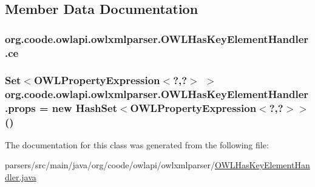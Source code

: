 \subsection{Member Data Documentation}
\hypertarget{classorg_1_1coode_1_1owlapi_1_1owlxmlparser_1_1_o_w_l_has_key_element_handler_a6058df6fb8f330e94ec80dbce0ddbad7}{
\subsubsection[{ce}]{ org.\-coode.\-owlapi.\-owlxmlparser.\-O\-W\-L\-Has\-Key\-Element\-Handler.\-ce\hspace{0.3cm}{\ttfamily [private]}}}\label{classorg_1_1coode_1_1owlapi_1_1owlxmlparser_1_1_o_w_l_has_key_element_handler_a6058df6fb8f330e94ec80dbce0ddbad7}
\hypertarget{classorg_1_1coode_1_1owlapi_1_1owlxmlparser_1_1_o_w_l_has_key_element_handler_af0151fe3603afd7f71d193151a4929a1}{
\subsubsection[{props}]{\setlength{\rightskip}{0pt plus 5cm}Set$<$O\-W\-L\-Property\-Expression$<$?,?$>$ $>$ org.\-coode.\-owlapi.\-owlxmlparser.\-O\-W\-L\-Has\-Key\-Element\-Handler.\-props = new Hash\-Set$<$O\-W\-L\-Property\-Expression$<$?,?$>$$>$()\hspace{0.3cm}{\ttfamily [private]}}}\label{classorg_1_1coode_1_1owlapi_1_1owlxmlparser_1_1_o_w_l_has_key_element_handler_af0151fe3603afd7f71d193151a4929a1}


The documentation for this class was generated from the following file\-:\begin{DoxyCompactItemize}
\item 
parsers/src/main/java/org/coode/owlapi/owlxmlparser/\hyperlink{_o_w_l_has_key_element_handler_8java}{O\-W\-L\-Has\-Key\-Element\-Handler.\-java}\end{DoxyCompactItemize}
